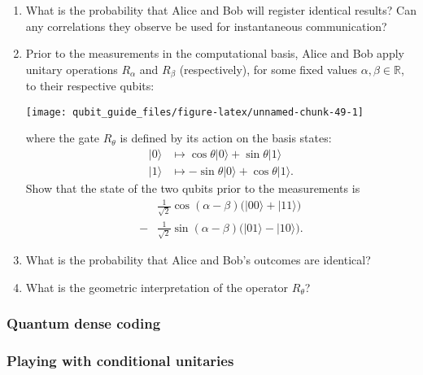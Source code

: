 \documentclass[fleqn]{article}
\begin{document}
\begin{enumerate}
\def\labelenumi{\arabic{enumi}.}
\item
  What is the probability that Alice and Bob will register identical results?
  Can any correlations they observe be used for instantaneous communication?
\item
  Prior to the measurements in the computational basis, Alice and Bob apply unitary operations \(R_\alpha\) and \(R_\beta\) (respectively), for some fixed values \(\alpha,\beta\in\mathbb{R}\), to their respective qubits:

  \begin{center}\texttt{[image: qubit\_guide\_files/figure-latex/unnamed-chunk-49-1]} \end{center}

  where the gate \(R_\theta\) is defined by its action on the basis states:
  \[
     \begin{aligned}
       |0\rangle
       &\longmapsto
       \cos\theta|0\rangle + \sin\theta|1\rangle
     \\|1\rangle
       &\longmapsto
       -\sin\theta|0\rangle + \cos\theta|1\rangle.
     \end{aligned}
   \]
  Show that the state of the two qubits prior to the measurements is
  \[
     \begin{aligned}
       &\frac{1}{\sqrt{2}}\cos(\alpha-\beta)\big( |00\rangle + |11\rangle \big)
     \\- &\frac{1}{\sqrt{2}}\sin(\alpha-\beta)\big( |01\rangle - |10\rangle \big).
     \end{aligned}
   \]
\item
  What is the probability that Alice and Bob's outcomes are identical?
\item
  What is the geometric interpretation of the operator \(R_\theta\)?
\end{enumerate}

\hypertarget{quantum-dense-coding}{%
\subsubsection{Quantum dense coding}\label{quantum-dense-coding}}

\hypertarget{playing-with-conditional-unitaries}{%
\subsubsection{Playing with conditional unitaries}\label{playing-with-conditional-unitaries}}
\end{document}
